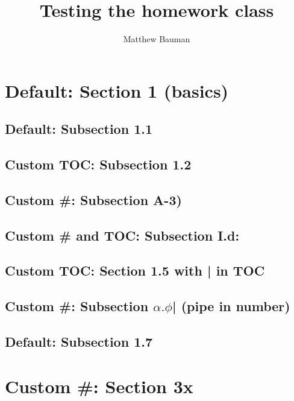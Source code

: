 \documentclass{homework}
\title{Testing the \textsf{homework} class}
\author{Matthew Bauman}
\begin{document}
\maketitle

\tableofcontents

\section{Default: Section 1 (basics)}

\subsection{Default: Subsection 1.1}

\subsection[Custom TOC: Subsection 1.2 (custom)]{Custom TOC: Subsection 1.2}

\subsection[A-3)|]{Custom \#: Subsection A-3)}

\subsection[I.d:|Custom \# and TOC: Subsection I.d: (custom)]{Custom \# and TOC: Subsection I.d:}

\subsection[{{Custom TOC: Section 1.5 with | in TOC (custom)}}]{Custom TOC: Section 1.5 with | in TOC}

\subsection[{{$\alpha.\phi$|}}|]{Custom \#: Subsection $\alpha.\phi$| (pipe in number)}

\subsection{Default: Subsection 1.7}

\section[3x|]{Custom \#: Section 3x}
\end{document}
